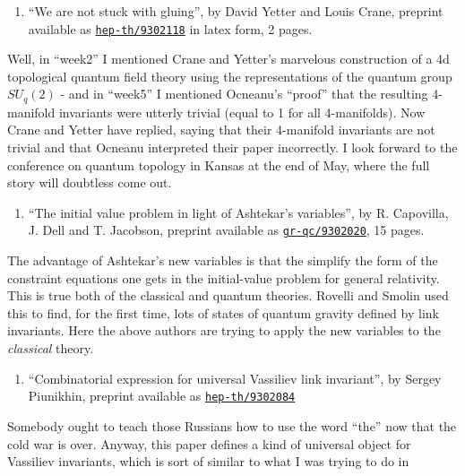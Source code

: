 \documentclass{article}
\def\tightlist{}
\begin{document}
\begin{enumerate}
\def\labelenumi{\arabic{enumi})}
\setcounter{enumi}{2}
\tightlist
\item
  ``We are not stuck with gluing'', by David Yetter and Louis Crane,
  preprint available as
  \href{http://xxx.lanl.gov/abs/hep-th/9302118}{\texttt{hep-th/9302118}}
  in latex form, 2 pages.
\end{enumerate}

Well, in ``week2'' I mentioned Crane and Yetter's marvelous construction
of a 4d topological quantum field theory using the representations of
the quantum group \(SU_q(2)\) - and in ``week5'' I mentioned Ocneanu's
``proof'' that the resulting 4-manifold invariants were utterly trivial
(equal to 1 for all 4-manifolds). Now Crane and Yetter have replied,
saying that their 4-manifold invariants are not trivial and that Ocneanu
interpreted their paper incorrectly. I look forward to the conference on
quantum topology in Kansas at the end of May, where the full story will
doubtless come out.

\begin{enumerate}
\def\labelenumi{\arabic{enumi})}
\setcounter{enumi}{3}
\tightlist
\item
  ``The initial value problem in light of Ashtekar's variables'', by R.
  Capovilla, J. Dell and T. Jacobson, preprint available as
  \href{http://xxx.lanl.gov/abs/gr-qc/9302020}{\texttt{gr-qc/9302020}},
  15 pages.
\end{enumerate}

The advantage of Ashtekar's new variables is that the simplify the form
of the constraint equations one gets in the initial-value problem for
general relativity. This is true both of the classical and quantum
theories. Rovelli and Smolin used this to find, for the first time, lots
of states of quantum gravity defined by link invariants. Here the above
authors are trying to apply the new variables to the \emph{classical}
theory.

\begin{enumerate}
\def\labelenumi{\arabic{enumi})}
\setcounter{enumi}{4}
\tightlist
\item
  ``Combinatorial expression for universal Vassiliev link invariant'',
  by Sergey Piunikhin, preprint available as
  \href{http://xxx.lanl.gov/abs/hep-th/9302084}{\texttt{hep-th/9302084}}
\end{enumerate}

Somebody ought to teach those Russians how to use the word ``the'' now
that the cold war is over. Anyway, this paper defines a kind of
universal object for Vassiliev invariants, which is sort of similar to
what I was trying to do in
\end{document}
